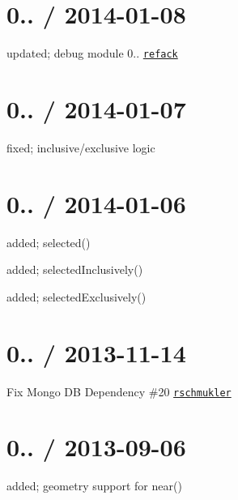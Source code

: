 \section*{0.. / 2014-\/01-\/08 }


\begin{DoxyItemize}
\item updated; debug module 0.. \href{https://github.com/refack}{\tt refack}
\end{DoxyItemize}

\section*{0.. / 2014-\/01-\/07 }


\begin{DoxyItemize}
\item fixed; inclusive/exclusive logic
\end{DoxyItemize}

\section*{0.. / 2014-\/01-\/06 }


\begin{DoxyItemize}
\item added; selected()
\item added; selected\+Inclusively()
\item added; selected\+Exclusively()
\end{DoxyItemize}

\section*{0.. / 2013-\/11-\/14 }


\begin{DoxyItemize}
\item Fix Mongo DB Dependency \#20 \href{https://github.com/rschmukler}{\tt rschmukler}
\end{DoxyItemize}

\section*{0.. / 2013-\/09-\/06 }


\begin{DoxyItemize}
\item added; geometry support for near()
\end{DoxyItemize}

